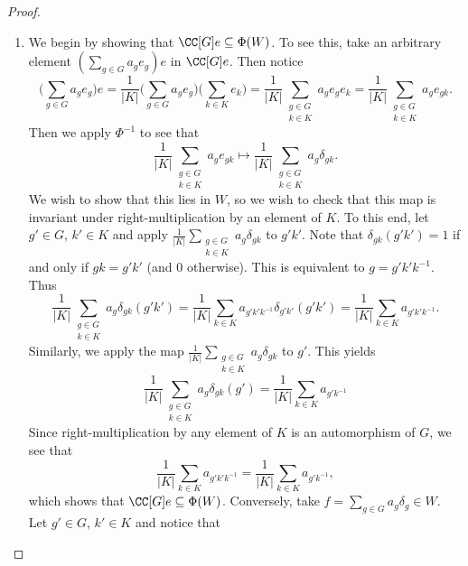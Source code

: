 \begin{proof}
    \begin{enumerate}[\itshape(i)]
        \item We begin by showing that $\CC[G]e\subseteq \Phi(W)$.
              To see this, take an arbitrary element $(\sum_{g\in G} a_ge_g)e$ in $\CC[G]e$.
              Then notice
              \[
                  \bigg(\sum_{g\in G} a_ge_g\bigg)e = \frac{1}{|K|}\bigg(\sum_{g\in G} a_ge_g\bigg)\bigg(\sum_{k\in K}e_k\bigg) = \frac{1}{|K|}\sum_{\substack{g\in G \\ k\in K}} a_ge_ge_k = \frac{1}{|K|}\sum_{\substack{g\in G \\ k\in K}} a_ge_{gk}.
              \]
              Then we apply $\Phi^{-1}$ to see that
              \[
                  \frac{1}{|K|}\sum_{\substack{g\in G \\ k\in K}} a_ge_{gk} \mapsto \frac{1}{|K|}\sum_{\substack{g\in G \\ k\in K}} a_g\delta_{gk}.
              \]
              We wish to show that this lies in $W$, so we wish to check that this map is invariant under right-multiplication by an element of $K$.
              To this end, let $g'\in G$, $k'\in K$ and apply $\frac{1}{|K|}\sum_{\substack{g\in G \\ k\in K}} a_g\delta_{gk}$ to $g'k'$.
              Note that $\delta_{gk}(g'k')=1$ if and only if $gk=g'k'$ (and $0$ otherwise).
              This is equivalent to $g=g'k'k^{-1}$.
              Thus
              \[
                  \frac{1}{|K|}\sum_{\substack{g\in G \\ k\in K}} a_g\delta_{gk}(g'k') = \frac{1}{|K|}\sum_{k\in K} a_{g'k'k^{-1}}\delta_{g'k'}(g'k') = \frac{1}{|K|}\sum_{k\in K} a_{g'k'k^{-1}}.
              \]
              Similarly, we apply the map $\frac{1}{|K|}\sum_{\substack{g\in G \\ k\in K}} a_g\delta_{gk}$ to $g'$.
              This yields
              \[
                  \frac{1}{|K|}\sum_{\substack{g\in G \\ k\in K}} a_g\delta_{gk}(g') = \frac{1}{|K|}\sum_{k\in K} a_{g'k^{-1}}
              \]
              Since right-multiplication by any element of $K$ is an automorphism of $G$, we see that
              \[
                  \frac{1}{|K|}\sum_{k\in K} a_{g'k'k^{-1}}=\frac{1}{|K|}\sum_{k\in K} a_{g'k^{-1}},
              \]
              which shows that $\CC[G]e\subseteq \Phi(W)$.
              Conversely, take $f=\sum_{g\in G} a_g\delta_g\in W$.
              Let $g'\in G$, $k'\in K$ and notice that
              \[
\]
\end{enumerate}
\end{proof}
